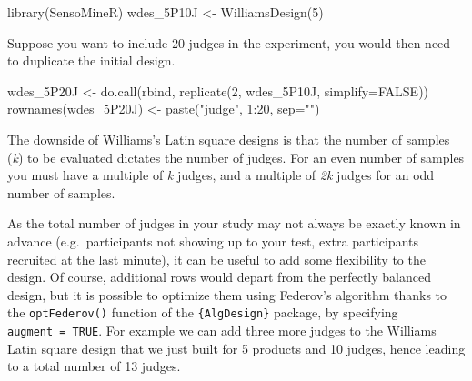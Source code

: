 \documentclass[
]{book}
\newenvironment{Shaded}{\begin{snugshade}}{\end{snugshade}}
\newcommand{\AttributeTok}[1]{\textcolor[rgb]{0.77,0.63,0.00}{#1}}
\newcommand{\ConstantTok}[1]{\textcolor[rgb]{0.00,0.00,0.00}{#1}}
\newcommand{\DecValTok}[1]{\textcolor[rgb]{0.00,0.00,0.81}{#1}}
\newcommand{\FunctionTok}[1]{\textcolor[rgb]{0.00,0.00,0.00}{#1}}
\newcommand{\NormalTok}[1]{#1}
\newcommand{\OtherTok}[1]{\textcolor[rgb]{0.56,0.35,0.01}{#1}}
\newcommand{\SpecialCharTok}[1]{\textcolor[rgb]{0.00,0.00,0.00}{#1}}
\newcommand{\StringTok}[1]{\textcolor[rgb]{0.31,0.60,0.02}{#1}}
\begin{document}
\begin{Shaded}
\begin{Highlighting}[]
\FunctionTok{library}\NormalTok{(SensoMineR)}
\NormalTok{wdes\_5P10J }\OtherTok{\textless{}{-}} \FunctionTok{WilliamsDesign}\NormalTok{(}\DecValTok{5}\NormalTok{)}
\end{Highlighting}
\end{Shaded}

Suppose you want to include 20 judges in the experiment, you would then need to duplicate the initial design.

\begin{Shaded}
\begin{Highlighting}[]
\NormalTok{wdes\_5P20J }\OtherTok{\textless{}{-}} \FunctionTok{do.call}\NormalTok{(rbind, }\FunctionTok{replicate}\NormalTok{(}\DecValTok{2}\NormalTok{, wdes\_5P10J, }\AttributeTok{simplify=}\ConstantTok{FALSE}\NormalTok{))}
\FunctionTok{rownames}\NormalTok{(wdes\_5P20J) }\OtherTok{\textless{}{-}} \FunctionTok{paste}\NormalTok{(}\StringTok{"judge"}\NormalTok{, }\DecValTok{1}\SpecialCharTok{:}\DecValTok{20}\NormalTok{, }\AttributeTok{sep=}\StringTok{""}\NormalTok{)}
\end{Highlighting}
\end{Shaded}

The downside of Williams's Latin square designs is that the number of samples (\emph{k}) to be evaluated dictates the number of judges. For an even number of samples you must have a multiple of \emph{k} judges, and a multiple of \emph{2k} judges for an odd number of samples.

As the total number of judges in your study may not always be exactly known in advance (e.g.~participants not showing up to your test, extra participants recruited at the last minute), it can be useful to add some flexibility to the design. Of course, additional rows would depart from the perfectly balanced design, but it is possible to optimize them using Federov's algorithm thanks to the \texttt{optFederov()} function of the \texttt{\{AlgDesign\}} package, by specifying \texttt{augment\ =\ TRUE}. For example we can add three more judges to the Williams Latin square design that we just built for 5 products and 10 judges, hence leading to a total number of 13 judges.
\end{document}
